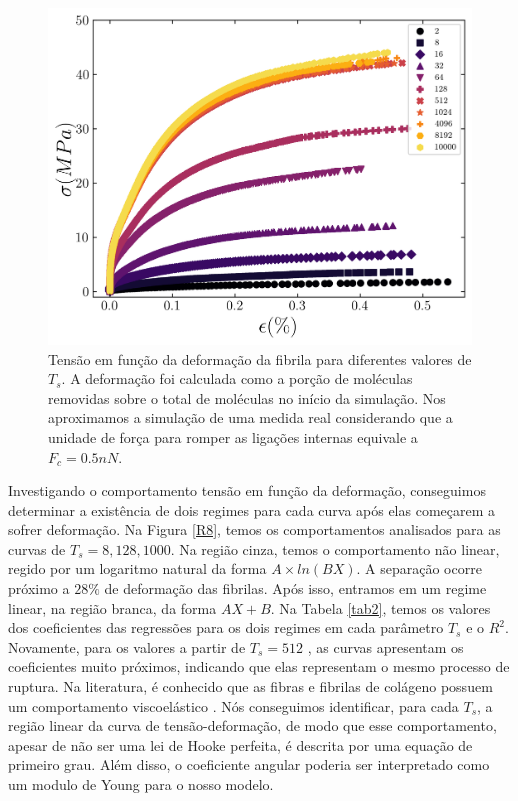 \documentclass[11pt,a4paper]{article} %
\begin{document}
 
        \begin{figure}[H] 

            \centering 
            \includegraphics[width=\textwidth]{figures/stress_strain.png} 
            \caption{Tensão em função da deformação da fibrila para diferentes valores de \(T_{s}\). A deformação foi calculada 
            como a porção de moléculas removidas sobre o total de moléculas no início da simulação. Nos aproximamos a simulação  
            de uma medida real considerando que a unidade de força para romper as ligações internas equivale a \( F_{c} = 0.5 nN\).}  
            \label{R5} 

        \end{figure} 

 
        Investigando o comportamento tensão em função da deformação, conseguimos determinar a existência de dois regimes  
        para cada curva após elas começarem a sofrer deformação. Na Figura \ref{R8}, temos os comportamentos analisados para  
        as curvas de \(T_{s} = 8, 128, 1000\). Na região cinza, temos o comportamento não linear, regido por um logaritmo  
        natural da forma \(A\times ln(BX)\). A separação ocorre próximo a \(28 \%\) de deformação das fibrilas. Após isso,  
        entramos em um regime linear, na região branca, da forma \(AX + B\). Na Tabela \ref{tab2}, temos os valores dos coeficientes 
        das regressões para os dois regimes em cada parâmetro \(T_{s}\) e o \(R^{2}\). Novamente, para os valores a partir de \(T_{s} = 512\) 
        , as curvas apresentam os coeficientes muito próximos, indicando que elas representam o mesmo processo de ruptura. 
        Na literatura, é conhecido que as fibras e fibrilas de colágeno possuem um comportamento viscoelástico \cite{Silver2008ViscoelasticityES, 
        shen2011viscoelastic}. Nós conseguimos identificar, para cada \(T_{s}\), a região linear da curva de tensão-deformação, de modo  
        que esse comportamento, apesar de não ser uma lei de Hooke perfeita, é descrita por uma equação de primeiro grau. Além disso, 
        o coeficiente angular poderia ser interpretado como um modulo de Young para o nosso modelo. 
\end{document}
